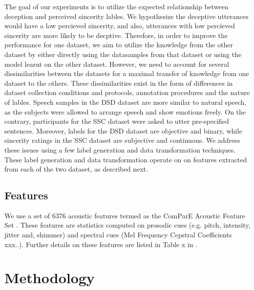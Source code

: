 \documentclass{article}
\begin{document}
The goal of our experiments is to utilize the expected relationship between deception and perceived sincerity lables.
We hypothesize the deceptive utterances would have a low percieved sincerity, and also, utterances with low percieved sincerity are more likely to be decptive.
Therefore, in order to improve the performance for one dataset, we aim to utilize the knowledge from the other dataset by either directly using the datasamples from that dataset or using the model learnt on the other dataset.
However, we need to account for several dissimilarities between the datasets for a maximal transfer of knowledge from one dataset to the others.
These dissimilarities exist in the form of differences in dataset collection conditions and protocols, annotation procedures and the nature of lables.
Speech samples in the DSD dataset are more similar to natural speech, as the subjects were allowed to arrange speech and show emotions freely. 
On the contrary, participants for the SSC dataset were asked to utter pre-specified sentences. 
Moreover, labels for the DSD dataset are objective and binary, while sincerity ratings in the SSC dataset are subjective and continuous.
We address these issues using a few label generation and data transformation techniques.
These label generation and data transformation operate on on features extracted from each of the two dataset, as described next.

\subsection{Features} 
We use a set of 6376 acoustic features termed as the ComParE Acoustic Feature Set \cite{}.
These features are statistics computed on prosodic cues (e.g. pitch, intensity, jitter and, shimmer) and spectral cues (Mel Frequency Cepstral Coefficients xxx..).
Further details on these features are listed in Table x in \cite{}. 


\section{Methodology}
\end{document}
